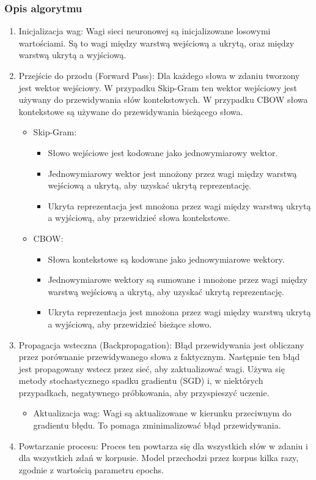 		\subsubsection{Opis algorytmu}
			\begin{enumerate}
				\item Inicjalizacja wag: Wagi sieci neuronowej są inicjalizowane losowymi wartościami. Są to wagi między warstwą wejściową a ukrytą, oraz między warstwą ukrytą a wyjściową.
				\item Przejście do przodu (Forward Pass): Dla każdego słowa w zdaniu tworzony jest wektor wejściowy. W przypadku Skip-Gram ten wektor wejściowy jest używany do przewidywania słów kontekstowych. W przypadku CBOW słowa kontekstowe są używane do przewidywania bieżącego słowa.
				\begin{itemize}
					\item Skip-Gram:
					\begin{itemize}
						\item Słowo wejściowe jest kodowane jako jednowymiarowy wektor.
						\item Jednowymiarowy wektor jest mnożony przez wagi między warstwą wejściową a ukrytą, aby uzyskać ukrytą reprezentację.
						\item Ukryta reprezentacja jest mnożona przez wagi między warstwą ukrytą a wyjściową, aby przewidzieć słowa kontekstowe.
					\end{itemize}
					\item CBOW:
					\begin{itemize}
						\item Słowa kontekstowe są kodowane jako jednowymiarowe wektory.
						\item Jednowymiarowe wektory są sumowane i mnożone przez wagi między warstwą wejściową a ukrytą, aby uzyskać ukrytą reprezentację.
						\item Ukryta reprezentacja jest mnożona przez wagi między warstwą ukrytą a wyjściową, aby przewidzieć bieżące słowo.
					\end{itemize}								
				\end{itemize}
				\item Propagacja wsteczna (Backpropagation): Błąd przewidywania jest obliczany przez porównanie przewidywanego słowa z faktycznym. Następnie ten błąd jest propagowany wstecz przez sieć, aby zaktualizować wagi. Używa się metody stochastycznego spadku gradientu (SGD) i, w niektórych przypadkach, negatywnego próbkowania, aby przyspieszyć uczenie.
				\begin{itemize}
					\item Aktualizacja wag: Wagi są aktualizowane w kierunku przeciwnym do gradientu błędu. To pomaga zminimalizować błąd przewidywania.
				\end{itemize}
				\item Powtarzanie procesu: Proces ten powtarza się dla wszystkich słów w zdaniu i dla wszystkich zdań w korpusie. Model przechodzi przez korpus kilka razy, zgodnie z wartością parametru epochs.
			\end{enumerate}
	
